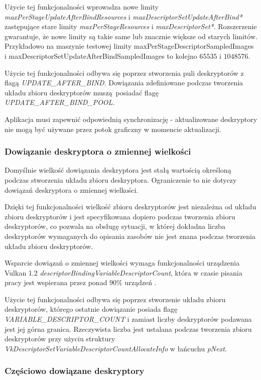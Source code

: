 Użycie tej funkcjonalności wprowadza nowe limity \textit{maxPerStageUpdateAfterBindResources} i \textit{maxDescriptorSetUpdateAfterBind*}
zastępujące stare limity \textit{maxPerStageResources} i \textit{maxDescriptorSet*}. Rozszerzenie gwarantuje, że nowe limity są takie same lub znacznie większe od starych limitów. Przykładowo na maszynie testowej limity maxPerStageDescriptorSampledImages i maxDescriptorSetUpdateAfterBindSampledImages to kolejno $65535$ i $1048576$.

Użycie tej funkcjonalności odbywa się poprzez stworzenia puli deskryptorów z flagą \textit{UPDATE\_AFTER\_BIND}. Dowiązania zdefiniowane podczas tworzenia układu zbioru deskryptorów muszą posiadać flagę
\textit{UPDATE\_AFTER\_BIND\_POOL}.

Aplikacja musi zapewnić odpowiednią synchronizację - aktualizowane deskryptory nie mogą być używane przez potok graficzny w momencie aktualizacji.

\subsubsection {Dowiązanie deskryptora o zmiennej wielkości}

Domyślnie wielkość dowiązania deskryptora jest stałą wartością określoną podczas stworzenia układu zbioru deskryptora.
Ograniczenie to nie dotyczy dowiązań deskryptora o zmiennej wielkości.

Dzięki tej funkcjonalności wielkość zbioru deskryptorów jest niezależna od układu zbioru deskryptorów i jest specyfikowana dopiero podczas tworzenia zbioru deskryptorów, co pozwala na obsługę sytuacji, w której dokładna liczba deskryptorów wymaganych do opisania zasobów nie jest znana podczas tworzenia układu zbioru deskryptorów.

Wsparcie dowiązań o zmiennej wielkości wymaga funkcjonalności urządzenia Vulkan 1.2 \textit{descriptorBindingVariableDescriptorCount}, która w czasie pisania pracy jest wspierana przez ponad $90\%$ urządzeń \cite{GPUINFO}.

Użycie tej funkcjonalności odbywa się poprzez stworzenie układu zbioru deskryptorów, którego ostatnie dowiązanie posiada flagę \textit{VARIABLE\_DESCRIPTOR\_COUNT} i zamiast liczby deskryptorów podawana jest jej górna granica.
Rzeczywista liczba jest ustalana podczas tworzenia zbioru deskryptorów przy użyciu struktury \textit{VkDescriptorSetVariableDescriptorCountAllocateInfo} w łańcuchu \textit{pNext}.

\subsubsection {Częściowo dowiązane deskryptory}

